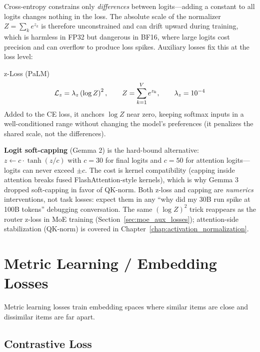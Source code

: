 Cross-entropy constrains only \textit{differences} between logits---adding a constant to all logits changes nothing in the loss. The absolute scale of the normalizer $Z = \sum_k e^{z_k}$ is therefore unconstrained and can drift upward during training, which is harmless in FP32 but dangerous in BF16, where large logits cost precision and can overflow to produce loss spikes. Auxiliary losses fix this at the loss level:

\begin{mathresult}{z-Loss (PaLM)}
\begin{equation}
\mathcal{L}_{z} = \lambda_z \left(\log Z\right)^2, \qquad Z = \sum_{k=1}^{V} e^{z_k}, \qquad \lambda_z = 10^{-4}
\end{equation}
Added to the CE loss, it anchors $\log Z$ near zero, keeping softmax inputs in a well-conditioned range without changing the model's preferences (it penalizes the shared scale, not the differences).
\end{mathresult}

\textbf{Logit soft-capping} (Gemma 2) is the hard-bound alternative: $z \leftarrow c \cdot \tanh(z/c)$ with $c = 30$ for final logits and $c = 50$ for attention logits---logits can never exceed $\pm c$. The cost is kernel compatibility (capping inside attention breaks fused FlashAttention-style kernels), which is why Gemma 3 dropped soft-capping in favor of QK-norm. Both z-loss and capping are \textit{numerics} interventions, not task losses: expect them in any ``why did my 30B run spike at 100B tokens'' debugging conversation. The same $(\log Z)^2$ trick reappears as the router z-loss in MoE training (Section~\ref{sec:moe_aux_losses}); attention-side stabilization (QK-norm) is covered in Chapter~\ref{chap:activation_normalization}.

\section{Metric Learning / Embedding Losses}
\label{sec:metric_losses}

Metric learning losses train embedding spaces where similar items are close and dissimilar items are far apart.

\subsection{Contrastive Loss}

